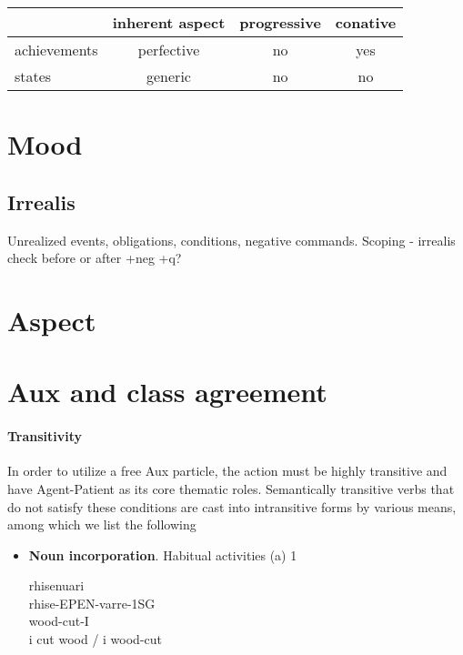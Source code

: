 \documentclass[8pt]{book}
\begin{document}
\begin{center}
\begin{tabular}{|l|c|c|c|}
\hline
& inherent aspect & progressive & conative \\ \hline
achievements & perfective & no & yes \\ \hline
states & generic & no & no \\\hline
\end{tabular}
\end{center}


\section{Mood}
\subsection{Irrealis}
Unrealized events, obligations, conditions, negative commands. Scoping - irrealis check before or after +neg +q?

\section{Aspect}

\section{Aux and class agreement}

\paragraph{Transitivity}
In order to utilize a free Aux particle, the action must be highly transitive and have Agent-Patient as its core thematic roles. Semantically transitive verbs that do not satisfy these conditions are cast into intransitive forms by various means, among which we list the following

\begin{itemize}
\item \textbf{Noun incorporation}. Habitual activities (a)
1  
  \begin{xlista}
    \ex rhisenuari \\
        rhise-EPEN-varre-1SG \\
        wood-cut-I \\
        i cut wood / i wood-cut
  \end{xlista}

\end{itemize}
\end{document}
